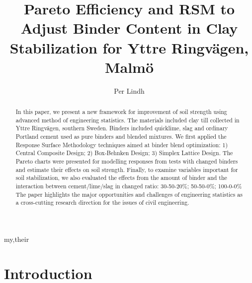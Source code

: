 \documentclass[eprint,
]{actapoly}
\begin{document}
\title[Pareto Efficiency and RSM to Adjust Binder Content]
{Pareto Efficiency and RSM to Adjust Binder Content in Clay Stabilization for Yttre Ringvägen, Malmö}

\author[P. Lindh]{Per Lindh}{my,their}


\begin{abstract}
In this paper, we present a new framework for improvement of soil strength using advanced method of engineering statistics. The materials included clay till collected in Yttre Ringvägen, southern Sweden. Binders included quicklime, slag and ordinary Portland cement used as pure binders and blended mixtures. We first applied the Response Surface Methodology techniques aimed at binder blend optimization: 1) Central Composite Design; 2) Box-Behnken Design; 3) Simplex Lattice Design. The Pareto charts were presented for modelling responses from tests with changed binders and estimate their effects on soil strength. Finally, to examine variables important for soil stabilization, we also evaluated the effects from the amount of binder and the interaction between cement/lime/slag in changed ratio: 30-50-20\%; 50-50-0\%; 100-0-0\% The paper highlights the major opportunities and challenges of engineering statistics as a cross-cutting research direction for the issues of civil engineering.
\end{abstract}


\maketitle

\section{Introduction}
\end{document}

